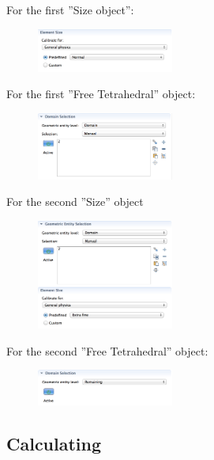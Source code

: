 For the first ''Size object'':\\
 \begin{figure}[H]
	\centering
  \includegraphics[width=0.4\textwidth]{Pictures/Screenshots/Sim21.png}
\end{figure} 


For the first ''Free Tetrahedral'' object:\\
 \begin{figure}[H]
	\centering
  \includegraphics[width=0.4\textwidth]{Pictures/Screenshots/Sim22.png}
\end{figure} 


For the second ''Size'' object\\
\begin{figure}[H]
	\centering
  \includegraphics[width=0.4\textwidth]{Pictures/Screenshots/Sim23.png}
\end{figure} 

For the second ''Free Tetrahedral'' object:\\
\begin{figure}[H]
	\centering
  \includegraphics[width=0.4\textwidth]{Pictures/Screenshots/Sim24.png}
\end{figure} 

\subsection{Calculating}

